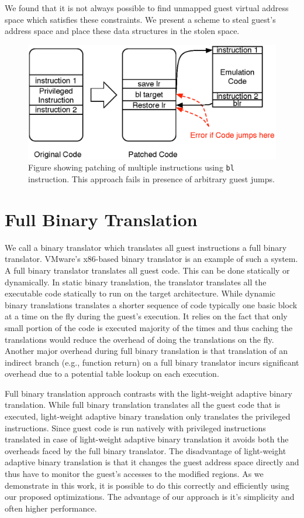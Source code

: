 We found that it is not always possible to find unmapped guest virtual address space which satisfies these constraints. We present a scheme to steal guest’s address space and place these data structures in the stolen space.

\begin{figure}
\centering
\includegraphics[scale=0.5]{multiple_ins_patching.eps}
\caption{\label{fig:multiple_insns_patching}Figure showing patching of multiple instructions using {\tt bl} instruction. This approach fails in presence of arbitrary guest jumps.}
\end{figure}

\section{Full Binary Translation}
\label{full_binary_translation}
We call a binary translator which translates all guest instructions a full binary translator. VMware’s x86-based binary translator\cite{adams:asplos06} is an example of such a system. A full binary translator translates all guest code. This can be done statically or dynamically. In static binary translation, the translator translates all the executable code statically to run on the target architecture. While dynamic binary translations translates a shorter sequence of code typically one basic block at a time on the fly during the guest's execution. It relies on the fact that only small portion of the code is executed majority of the times and thus caching the translations would reduce the overhead of doing the translations on the fly. Another major overhead during full binary translation is that translation of an indirect branch (e.g., function return) on a full binary translator incurs significant overhead due to a potential table lookup on each execution.

Full binary translation approach contrasts with the light-weight adaptive binary translation. While full binary translation translates all the guest code that is executed, light-weight adaptive binary translation only translates the privileged instructions. Since guest code is run natively with privileged instructions translated in case of light-weight adaptive binary translation it avoids both the overheads faced by the full binary translator. The disadvantage of light-weight adaptive binary translation is that it changes the guest address space directly and thus have to monitor the guest's accesses to the modified regions. As we demonstrate in this work, it is possible to do this correctly and efficiently using our proposed optimizations. The advantage of our approach is it’s simplicity and often higher performance.

